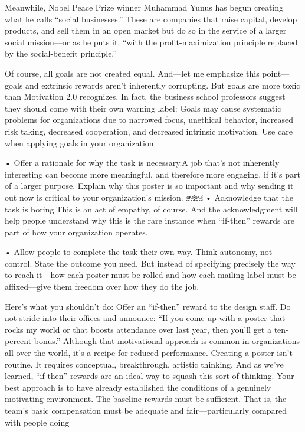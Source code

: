 Meanwhile, Nobel Peace Prize winner Muhammad Yunus has begun creating what he calls “social businesses.” These are companies that raise capital, develop products, and sell them in an open market but do so in the service of a larger social mission—or as he puts it, “with the profit-maximization principle replaced by the social-benefit principle.”



Of course, all goals are not created equal. And—let me emphasize this point—goals and extrinsic rewards aren’t inherently corrupting. But goals are more toxic than Motivation 2.0 recognizes. In fact, the business school professors suggest they should come with their own warning label: Goals may cause systematic problems for organizations due to narrowed focus, unethical behavior, increased risk taking, decreased cooperation, and decreased intrinsic motivation. Use care when applying goals in your organization.

• Offer a rationale for why the task is necessary.A job that’s not inherently interesting can become more meaningful, and therefore more engaging, if it’s part of a larger purpose. Explain why this poster is so important and why sending it out now is critical to your organization’s mission.
￼￼
• Acknowledge that the task is boring.This is an act of empathy, of course. And the acknowledgment will help people understand why this is the rare instance when “if-then” rewards are part of how your organization operates.

• Allow people to complete the task their own way. Think autonomy, not control. State the outcome you need. But instead of specifying precisely the way to reach it—how each poster must be rolled and how each mailing label must be affixed—give them freedom over how they do the job.

Here’s what you shouldn’t do: Offer an “if-then” reward to the design staff. Do not stride into their offices and announce: “If you come up with a poster that rocks my world or that boosts attendance over last year, then you’ll get a ten-percent bonus.” Although that motivational approach is common in organizations all over the world, it’s a recipe for reduced performance. Creating a poster isn’t routine. It requires conceptual, breakthrough, artistic thinking. And as we’ve learned, “if-then” rewards are an ideal way to squash this sort of thinking.
Your best approach is to have already established the conditions of a genuinely motivating environment. The baseline rewards must be sufficient. That is, the team’s basic compensation must be adequate and fair—particularly compared with people doing

